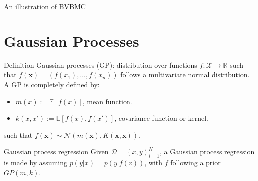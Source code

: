 \documentclass{beamer}
\def \Ev {{\mathbb E}}
\begin{document}
\begin{frame}{}
\begin{block}{An illustration of BVBMC}
{
}
\end{block}
\end{frame}

\section{Gaussian Processes}
\begin{frame}{}
\begin{block}{Definition}
Gaussian processes (GP): distribution over functions $f:\mathcal{X} \to \mathbb{R}$ such that $f(\mathbf{x}) = (f(x_1),\ldots,f(x_n))$ follows a multivariate normal distribution. A GP is completely defined by:
\begin{itemize}
\item $m(x) := \Ev[f(x)]$, mean function.
\item $k(x,x') := \Ev[f(x),f(x')]$, covariance function or kernel.
\end{itemize}
such that $f(\mathbf{x}) \sim \mathcal{N}(m(\mathbf{x}),K(\mathbf{x},\mathbf{x}))$.
\end{block}
\begin{block}{Gaussian process regression}
Given $\mathcal{D} = {(x,y)}_{i=1}^N$, a Gaussian process regression is made by assuming $p(y|x) = p(y|f(x))$, with $f$ following a prior $GP(m,k)$.
\end{block}

\end{frame}
\end{document}
